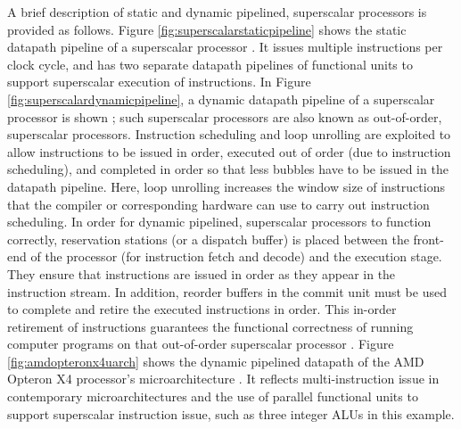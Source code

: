 A brief description of static and dynamic pipelined, superscalar processors is provided as follows. Figure \ref{fig:superscalarstaticpipeline} shows the static datapath pipeline of a superscalar processor \cite{Patterson2012}. It issues multiple instructions per clock cycle, and has two separate datapath pipelines of functional units to support superscalar execution of instructions. In Figure \ref{fig:superscalardynamicpipeline}, a dynamic datapath pipeline of a superscalar processor is shown \cite{Patterson2012}; such superscalar processors are also known as out-of-order, superscalar processors. Instruction scheduling and loop unrolling are exploited to allow instructions to be issued in order, executed out of order (due to instruction scheduling), and completed in order so that less bubbles have to be issued in the datapath pipeline. Here, loop unrolling increases the window size of instructions that the compiler or corresponding hardware can use to carry out instruction scheduling. In order for dynamic pipelined, superscalar processors to function correctly, reservation stations (or a dispatch buffer) is placed between the front-end of the processor (for instruction fetch and decode) and the execution stage. They ensure that instructions are issued in order as they appear in the instruction stream. In addition, reorder buffers in the commit unit must be used to complete and retire the executed instructions in order. This in-order retirement of instructions guarantees the functional correctness of running computer programs on that out-of-order superscalar processor
\cite{Hennessy2012,Shen2005a}. Figure \ref{fig:amdopteronx4uarch} shows the dynamic pipelined datapath of the AMD Opteron X4 processor's microarchitecture \cite{Patterson2012}. It reflects multi-instruction issue in contemporary microarchitectures and the use of parallel functional units to support superscalar instruction issue, such as three integer ALUs in this example.


























































